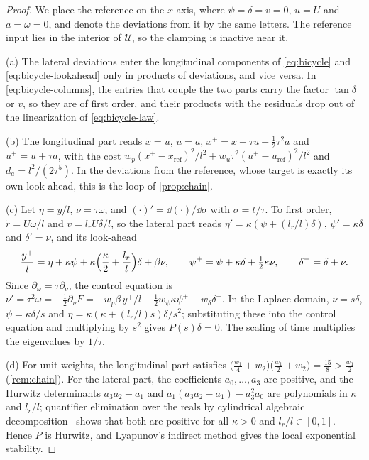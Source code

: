 \begin{proof}
We place the reference on the $x$-axis, where $\psi = \delta = v = 0$, $u = U$ and $a = \omega = 0$,
and denote the deviations from it by the same letters.
The reference input lies in the interior of $\mathcal{U}$, so the clamping is inactive near it.

(a) The lateral deviations enter the longitudinal components of \eqref{eq:bicycle} and
\eqref{eq:bicycle-lookahead} only in products of deviations, and vice versa.
In \eqref{eq:bicycle-columns}, the entries that couple the two parts carry the factor $\tan\delta$
or $v$, so they are of first order, and their products with the residuals drop out of the
linearization of \eqref{eq:bicycle-law}.

(b) The longitudinal part reads $\dot x = u$, $\dot u = a$, $x^+ = x + \tau u + \frac12\tau^2 a$ and
$u^+ = u + \tau a$, with the cost $w_p(x^+ - x_{\mathrm{ref}})^2/l^2 +
w_u\tau^2(u^+ - u_{\mathrm{ref}})^2/l^2$ and $d_a = l^2/(2\tau^5)$.
In the deviations from the reference, whose target is exactly its own look-ahead, this is the loop
of \cref{prop:chain}.

(c) Let $\eta = y/l$, $\nu = \tau\omega$, and $(\cdot)' = \dd(\cdot)/\dd\sigma$ with $\sigma = t/\tau$.
To first order, $\dot r = U\omega/l$ and $v = l_r U\delta/l$, so the lateral part reads
$\eta' = \kappa(\psi + (l_r/l)\delta)$, $\psi' = \kappa\delta$ and $\delta' = \nu$, and its look-ahead
\[
    \frac{y^+}{l} = \eta + \kappa\psi + \kappa\Bigl(\frac{\kappa}{2} + \frac{l_r}{l}\Bigr)\delta
    + \beta\nu,
    \qquad \psi^+ = \psi + \kappa\delta + \tfrac12\kappa\nu, \qquad \delta^+ = \delta + \nu .
\]
Since $\partial_\omega = \tau\partial_\nu$, the control equation is
$\nu' = \tau^2\dot\omega = -\frac12\partial_\nu F
= -w_p\beta\,y^+/l - \frac12 w_\psi\kappa\psi^+ - w_\delta\delta^+$.
In the Laplace domain, $\nu = s\delta$, $\psi = \kappa\delta/s$ and
$\eta = \kappa(\kappa + (l_r/l)s)\delta/s^2$; substituting these into the control equation and
multiplying by $s^2$ gives $P(s)\delta = 0$.
The scaling of time multiplies the eigenvalues by $1/\tau$.

(d) For unit weights, the longitudinal part satisfies
$\bigl(\frac{w_1}{4} + w_2\bigr)\bigl(\frac{w_1}{2} + w_2\bigr) = \frac{15}{8} > \frac{w_1}{2}$
(\cref{rem:chain}).
For the lateral part, the coefficients $a_0,\dots,a_3$ are positive, and the Hurwitz determinants
$a_3a_2 - a_1$ and $a_1(a_3a_2 - a_1) - a_3^2a_0$ are polynomials in $\kappa$ and $l_r/l$;
quantifier elimination over the reals by cylindrical algebraic decomposition~\citep{collins1975quantifier}
shows that both are positive for all $\kappa > 0$ and $l_r/l\in[0,1]$.
Hence $P$ is Hurwitz, and Lyapunov's indirect method gives the local exponential stability.
\end{proof}

